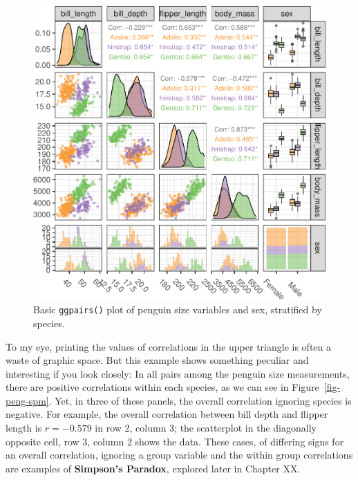 \documentclass[
  letterpaper,
  10pt,
  krantz2]{krantz}
\begin{document}
\begin{figure}[H]

{\centering \includegraphics[width=1\textwidth,height=\textheight]{figs/ch03/fig-peng-ggpairs1-1.pdf}

}

\caption{\label{fig-peng-ggpairs1}Basic \texttt{ggpairs()} plot of
penguin size variables and sex, stratified by species.}

\end{figure}

To my eye, printing the values of correlations in the upper triangle is
often a waste of graphic space. But this example shows something
peculiar and interesting if you look closely: In all pairs among the
penguin size measurements, there are positive correlations within each
species, as we can see in Figure~\ref{fig-peng-spm}. Yet, in three of
these panels, the overall correlation ignoring species is negative. For
example, the overall correlation between bill depth and flipper length
is \(r = -0.579\) in row 2, column 3; the scatterplot in the diagonally
opposite cell, row 3, column 2 shows the data. These cases, of differing
signs for an overall correlation, ignoring a group variable and the
within group correlations are examples of \textbf{Simpson's Paradox},
explored later in Chapter XX.
\end{document}
